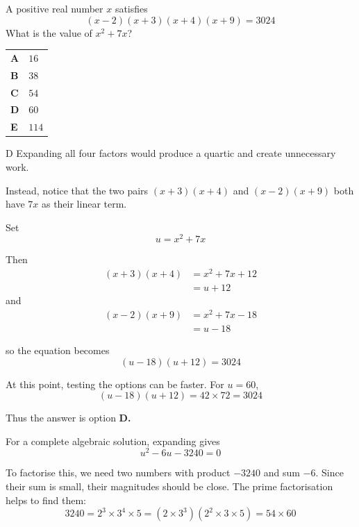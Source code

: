 \documentclass[11pt,a4paper]{article}
\begin{document}
\clearpage
\thispagestyle{djssolutions}
\vspace*{8pt}
\begin{enumerate}[label=\textbf{\arabic*.},leftmargin=*,itemsep=0pt,start=4]
\questionitem[Algebra]
A positive real number $x$ satisfies
\[
(x-2)(x+3)(x+4)(x+9)=3024
\]
What is the value of $x^2+7x$?

\par\vspace*{12pt}
\begin{tabularx}{\linewidth}{@{}>{\bfseries}l Y@{}}
A &
$16$
\\[0.8em]
B &
$38$
\\[0.8em]
C &
$54$
\\[0.8em]
D &
$60$
\\[0.8em]
E &
$114$
\\
\end{tabularx}

\begin{djsSolution}{D}
Expanding all four factors would produce a quartic and create unnecessary work. 

Instead, notice that the two pairs $(x+3)(x+4)$ and $(x-2)(x+9)$ both have $7x$ as their linear term. 

Set
\[
u=x^2+7x
\]

Then
\begin{align*}
(x+3)(x+4)&=x^2+7x+12\\[5pt]
            &=u+12
\end{align*}
and
\begin{align*}
    (x-2)(x+9)&=x^2+7x-18\\[5pt]
            &=u-18
\end{align*}

so the equation becomes
\[
(u-18)(u+12)=3024
\]

At this point, testing the options can be faster. For $u=60$,
\[
(u-18)(u+12)=42\times72=3024
\]

Thus the answer is option \textbf{D.}

For a complete algebraic solution, expanding gives
\[
u^2-6u-3240=0
\]

To factorise this, we need two numbers with product $-3240$ and sum $-6$. Since their sum is small, their magnitudes should be close. The prime factorisation helps to find them:
\[
3240=2^3\times3^4\times5=(2\times3^3)(2^2\times3\times5)=54\times60
\]


\end{djsSolution}
\end{enumerate}
\end{document}
